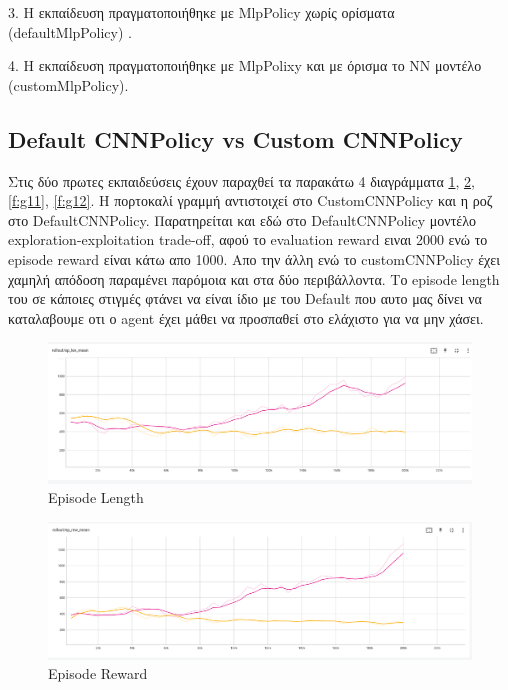 3. Η εκπαίδευση πραγματοποιήθηκε με MlpPolicy χωρίς ορίσματα (defaultMlpPolicy) .

4. Η εκπαίδευση πραγματοποιήθηκε με MlpPolixy και με όρισμα το NN μοντέλο (customMlpPolicy).



\subsection{Default CNNPolicy vs Custom CNNPolicy}



Στις δύο πρωτες εκπαιδεύσεις έχουν παραχθεί τα παρακάτω 4 διαγράμματα \ref{f:g9}, \ref{f:g10}, \ref{f:g11}, \ref{f:g12}.
Η πορτοκαλί γραμμή αντιστοιχεί στο CustomCNNPolicy και η ροζ στο DefaultCNNPolicy. Παρατηρείται και εδώ στο DefaultCNNPolicy μοντέλο exploration-exploitation trade-off, αφού το evaluation reward ειναι 2000 ενώ το episode reward είναι κάτω απο 1000. Απο την άλλη ενώ το customCNNPolicy έχει χαμηλή απόδοση παραμένει παρόμοια και στα δύο περιβάλλοντα. Το episode length του σε κάποιες στιγμές φτάνει να είναι ίδιο με του Default που αυτο μας δίνει να καταλαβουμε οτι ο agent έχει μάθει να προσπαθεί στο ελάχιστο για να μην χάσει.






\begin{figure}[ht]
	\centering
	\includegraphics[width=1\linewidth]{Results/A2C_CNN/ep_length.png}
	\caption{ Episode Length}
	\label{f:g9}	
\end{figure}


\begin{figure}[ht]
	\centering
	\includegraphics[width=1\linewidth]{Results/A2C_CNN/ep_reward.png}
	\caption{ Episode Reward }
	\label{f:g10}	
\end{figure}

